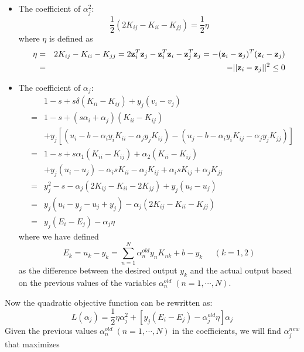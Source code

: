 \documentclass{article}
\begin{document}
\begin{itemize}
\item The coefficient of $\alpha_j^2$:
  \begin{equation}
    \frac{1}{2}(2K_{ij}-K_{ii}-K_{jj})=\frac{1}{2}\eta
  \end{equation}
  where $\eta$ is defined as
  \begin{eqnarray}
    \eta&=&2K_{ij}-K_{ii}-K_{jj}
    =2{\bf z}_i^T{\bf z}_j-{\bf z}_i^T{\bf z}_i-{\bf z}_j^T{\bf z}_j
    =-({\bf z}_i-{\bf z}_j)^T({\bf z}_i-{\bf z}_j)
    \nonumber\\
    &=&-||{\bf z}_i-{\bf z}_j||^2\le 0
  \end{eqnarray}
\item The coefficient of $\alpha_j$:
  \begin{eqnarray}
    &&1-s+s\delta(K_{ii}-K_{ij})+y_j(v_i-v_j)
    \nonumber\\
    &=&1-s+(s\alpha_i+\alpha_j)(K_{ii}-K_{ij})
    \nonumber\\
    &&+y_j[(u_i-b-\alpha_iy_iK_{ii}-\alpha_jy_jK_{ij})-
      (u_j-b-\alpha_iy_iK_{ij}-\alpha_jy_jK_{jj})]
    \nonumber\\
    &=&1-s+s\alpha_1(K_{ii}-K_{ij})+\alpha_2(K_{ii}-K_{ij})
    \nonumber\\
    &&+y_j(u_i-u_j)-\alpha_isK_{ii}-\alpha_jK_{ij}
    +\alpha_isK_{ij}+\alpha_jK_{jj}
    \nonumber\\
    &=&y_j^2-s-\alpha_j(2K_{ij}-K_{ii}-2K_{jj})+y_j(u_i-u_j)
    \nonumber\\
    &=&y_j(u_i-y_j-u_j+y_j)-\alpha_j(2K_{ij}-K_{ii}-K_{jj})
    \nonumber\\
    &=&y_j(E_i-E_j)-\alpha_j\eta
  \end{eqnarray}
  where we have defined 
  \begin{equation}
    E_k=u_k-y_k=\sum_{n=1}^N\alpha^{old}_ny_nK_{nk}+b-y_k
    \;\;\;\;\;(k=1,2)
  \end{equation}
  as the difference between the desired output $y_k$ and the 
  actual output based on the previous values of the variables 
  $\alpha_n^{old}\;(n=1,\cdots,N)$.
\end{itemize}
Now the quadratic objective function can be rewritten as:
\begin{equation}
  L(\alpha_j)=\frac{1}{2}\eta\alpha_j^2
  +\left[y_j(E_i-E_j)-\alpha_j^{old}\eta\right]\alpha_j
\end{equation}
Given the previous values $\alpha_n^{old}\;(n=1,\cdots,N)$ in 
the coefficients, we will find $\alpha_j^{new}$ that maximizes
\end{document}
